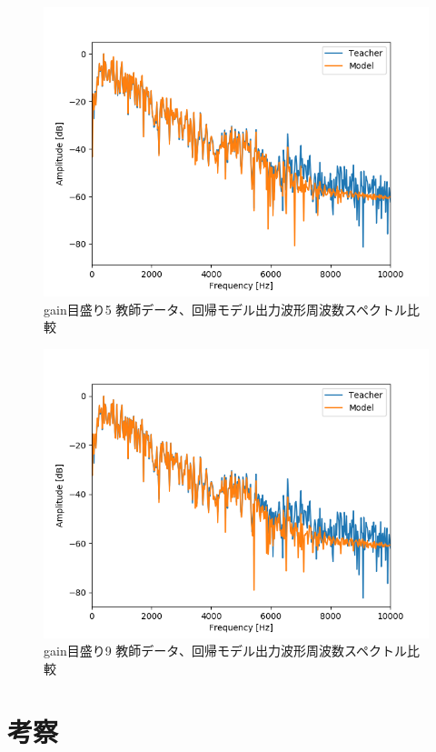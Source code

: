 \documentclass{jreport}		%
\begin{document}
\begin{figure}[htbp]
 \begin{center}
  \includegraphics[width=150mm]{gain5_fft_hikaku.png}
 \end{center}
 \caption{gain目盛り5 教師データ、回帰モデル出力波形周波数スペクトル比較}
 \label{fig:one}
\end{figure}

\begin{figure}[htbp]
 \begin{center}
  \includegraphics[width=150mm]{gain10_fft_hikaku.png}
 \end{center}
 \caption{gain目盛り9 教師データ、回帰モデル出力波形周波数スペクトル比較}
 \label{fig:one}
\end{figure}

\clearpage
\chapter{考察}
\end{document}
